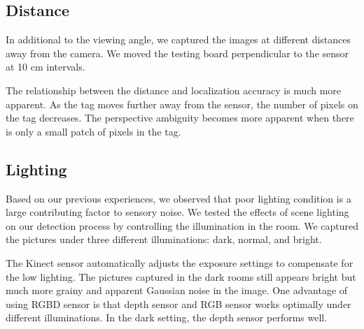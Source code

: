\subsection{Distance}
In additional to the viewing angle, we captured the images at different distances away from the camera. We moved the testing board perpendicular to the sensor at 10 cm intervals. 

The relationship between the distance and localization accuracy is much more apparent. As the tag moves further away from the sensor, the number of pixels on the tag decreases. The perspective ambiguity becomes more apparent when there is only a small patch of pixels in the tag. 
\subsection{Lighting}
Based on our previous experiences, we observed that poor lighting condition is a large contributing factor to sensory noise. We tested the effects of scene lighting on our detection process by controlling the illumination in the room. We captured the pictures under three different illuminations: dark, normal, and bright. 

The Kinect sensor automatically adjusts the exposure settings to compensate for the low lighting. The pictures captured in the dark rooms still appears bright but much more grainy and apparent Gaussian noise in the image. One advantage of using RGBD sensor is that depth sensor and RGB sensor works optimally under different illuminations. In the dark setting, the depth sensor performs well. 
